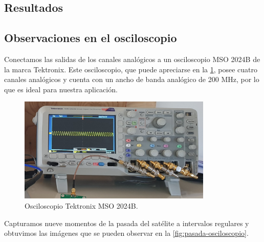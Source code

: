 \documentclass{article}
\newenvironment{standalone}{\begin{preview}}{\end{preview}}
\begin{document}
\begin{standalone}
  \section{Resultados}

  \subsection{Observaciones en el osciloscopio}

  Conectamos las salidas de los canales analógicos a un osciloscopio MSO 2024B de la marca Tektronix.
  Este osciloscopio, que puede apreciarse en la \cref{fig:osciloscopio}, posee cuatro canales analógicos y cuenta con un ancho de banda analógico de 200 MHz, por lo que es ideal para nuestra aplicación.

  \begin{figure}[!htbp]
    \centering
    \includegraphics[width=\linewidth, height=50mm, keepaspectratio]{../images/osciloscopio.jpg}
    \caption{Osciloscopio Tektronix MSO 2024B.}
    \label{fig:osciloscopio}
  \end{figure}

  Capturamos nueve momentos de la pasada del satélite a intervalos regulares y obtuvimos las imágenes que se pueden observar en la \cref{fig:pasada-osciloscopio}.

  \begin{figure}[!htbp]
    \centering


\end{figure}
\end{standalone}
\end{document}
